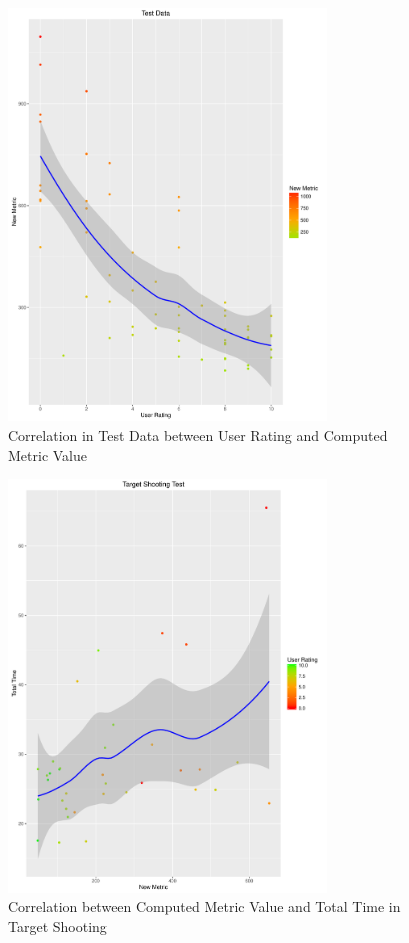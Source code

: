 \documentclass{sig-alternate-05-2015}
\begin{document}
\begin{figure}
\centering
\includegraphics[width=8.45cm]{TestData}
\vspace{-20pt}
\caption{Correlation in Test Data between User Rating and Computed Metric Value}
\vspace{-10pt}
\label{fig:testData}
\end{figure}

\begin{figure}
\centering
\includegraphics[width=8.45cm]{TargetShooting}
\vspace{-20pt}
\caption{Correlation between Computed Metric Value and Total Time in Target Shooting}
\label{fig:targetShooting}
\vspace{-10pt}
\end{figure}
\end{document}
